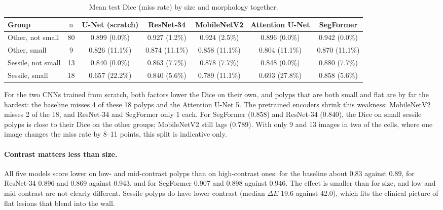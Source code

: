 \begin{table}[t]
  \centering
  \small
  \begin{adjustbox}{max width=\textwidth}
  \begin{tabular}{@{}lcccccc@{}}
    \toprule
    Group & $n$ & U-Net (scratch) & ResNet-34 & MobileNetV2 & Attention U-Net & SegFormer \\
    \midrule
    Other, not small   & 80 & 0.899 (0.0\%)  & 0.927 (1.2\%)  & 0.924 (2.5\%)  & 0.896 (0.0\%)  & 0.942 (0.0\%) \\
    Other, small       & 9  & 0.826 (11.1\%) & 0.874 (11.1\%) & 0.858 (11.1\%) & 0.804 (11.1\%) & 0.870 (11.1\%) \\
    Sessile, not small & 13 & 0.840 (0.0\%)  & 0.863 (7.7\%)  & 0.878 (7.7\%)  & 0.848 (0.0\%)  & 0.880 (7.7\%) \\
    Sessile, small     & 18 & 0.657 (22.2\%) & 0.840 (5.6\%)  & 0.789 (11.1\%) & 0.693 (27.8\%) & 0.858 (5.6\%) \\
    \bottomrule
  \end{tabular}
  \end{adjustbox}
  \caption{Mean test Dice (miss rate) by size and morphology together.}
  \label{tab:size-morph}
\end{table}

For the two CNNs trained from scratch, both factors lower the Dice on their own, and polyps that are both small
and flat are by far the hardest: the baseline misses 4 of these 18 polyps and the Attention U-Net 5. The
pretrained encoders shrink this weakness: MobileNetV2 misses 2 of the 18, and ResNet-34 and SegFormer only 1
each. For SegFormer (0.858) and ResNet-34 (0.840), the Dice on small sessile polyps is close to their Dice on the
other groups; MobileNetV2 still lags (0.789). With only 9 and 13 images in two of the cells, where one image
changes the miss rate by 8--11 points, this split is indicative only.

\paragraph{Contrast matters less than size.} All five models score lower on low- and mid-contrast polyps than on
high-contrast ones: for the baseline about 0.83 against 0.89, for ResNet-34 0.896 and 0.869 against 0.943, and
for SegFormer 0.907 and 0.898 against 0.946. The effect is smaller than for size, and low and mid contrast are
not clearly different. Sessile polyps do have lower contrast (median $\Delta E$ 19.6 against 42.0), which fits the
clinical picture of flat lesions that blend into the wall.

